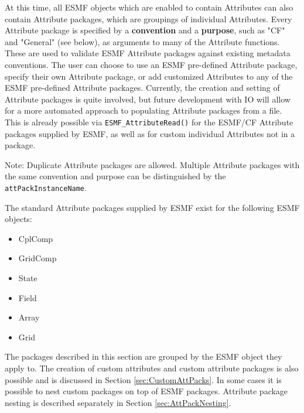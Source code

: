 %


\label{sec:AttPacks}

At this time, all ESMF objects which are enabled to contain Attributes can also contain Attribute packages, which are groupings of individual Attributes.  Every Attribute package is specified by a {\bf convention} and a {\bf purpose}, such as "CF" and "General" (see below), as arguments to many of the Attribute functions.  These are used to validate ESMF Attribute packages against existing metadata conventions.  The user can choose to use an ESMF pre-defined Attribute package, specify their own Attribute package, or add customized Attributes to any of the ESMF pre-defined Attribute packages. Currently, the creation and setting of Attribute packages is quite involved, but future development with IO will allow for a more automated approach to populating Attribute packages from a file.  This is already possible via {\tt ESMF\_AttributeRead()} for the ESMF/CF Attribute packages supplied by ESMF, as well as for custom individual Attributes not in a package.

Note: Duplicate Attribute packages are allowed.  Multiple Attribute packages with the same convention and purpose can be distinguished by the {\tt attPackInstanceName}.

The standard Attribute packages supplied by ESMF exist for the following ESMF objects:

\begin{itemize}
    \item CplComp
    \item GridComp
    \item State
    \item Field
    \item Array
    \item Grid
\end{itemize}

The packages described in this section are grouped by the ESMF object they apply to. The creation of custom attributes and custom attribute packages is also possible and is discussed in Section \ref{sec:CustomAttPacks}. In some cases it is possible to nest custom packages on top of ESMF packages. Attribute package nesting is described separately in Section \ref{sec:AttPackNesting}.

